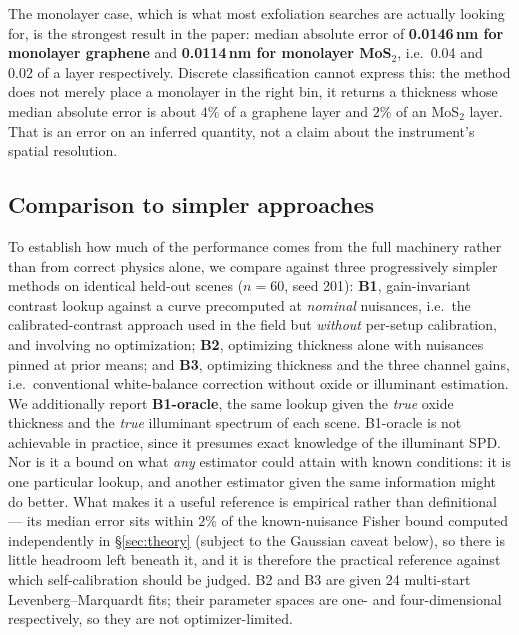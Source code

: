 \documentclass[10pt]{article}
\begin{document}
The monolayer case, which is what most exfoliation searches are actually looking for, is the strongest result in the paper: median absolute error of \textbf{0.0146\,nm for monolayer graphene} and \textbf{0.0114\,nm for monolayer MoS$_2$}, i.e.\ 0.04 and 0.02 of a layer respectively. Discrete classification cannot express this: the method does not merely place a monolayer in the right bin, it returns a thickness whose median absolute error is about $4\%$ of a graphene layer and $2\%$ of an MoS$_2$ layer. That is an error on an inferred quantity, not a claim about the instrument's spatial resolution.

\subsection{Comparison to simpler approaches}\label{sec:baselines}
To establish how much of the performance comes from the full machinery rather than from correct physics alone, we compare against three progressively simpler methods on identical held-out scenes ($n{=}60$, seed 201): \textbf{B1}, gain-invariant contrast lookup against a curve precomputed at \emph{nominal} nuisances, i.e.\ the calibrated-contrast approach used in the field but \emph{without} per-setup calibration, and involving no optimization; \textbf{B2}, optimizing thickness alone with nuisances pinned at prior means; and \textbf{B3}, optimizing thickness and the three channel gains, i.e.\ conventional white-balance correction without oxide or illuminant estimation. We additionally report \textbf{B1-oracle}, the same lookup given the \emph{true} oxide thickness and the \emph{true} illuminant spectrum of each scene. B1-oracle is not achievable in practice, since it presumes exact knowledge of the illuminant SPD. Nor is it a bound on what \emph{any} estimator could attain with known conditions: it is one particular lookup, and another estimator given the same information might do better. What makes it a useful reference is empirical rather than definitional --- its median error sits within $2\%$ of the known-nuisance Fisher bound computed independently in \S\ref{sec:theory} (subject to the Gaussian caveat below), so there is little headroom left beneath it, and it is therefore the practical reference against which self-calibration should be judged. B2 and B3 are given 24 multi-start Levenberg--Marquardt fits; their parameter spaces are one- and four-dimensional respectively, so they are not optimizer-limited.
\end{document}

